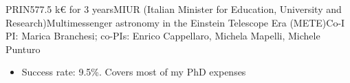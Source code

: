 %
%
%


\begin{experiences}
     {PRIN}{577.5 k€ for 3 years}{MIUR (Italian Minister for Education, University and Research)}{Multimessenger astronomy in the Einstein Telescope Era (METE)}{Co-I} {PI: Marica Branchesi; co-PIs: Enrico Cappellaro, Michela Mapelli, Michele Punturo}{ 
    \begin{itemize}
        \item Success rate: 9.5\%. Covers most of my PhD expenses
    \end{itemize}
    }
\end{experiences}
